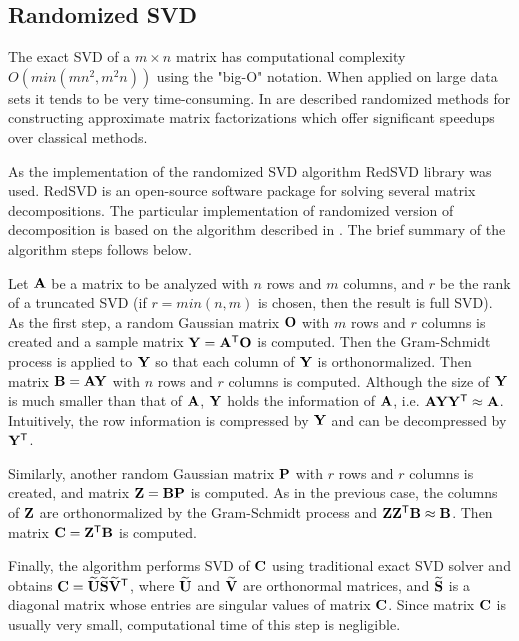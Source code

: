 \subsection{Randomized SVD}

The exact SVD of a $m \times n$ matrix has computational complexity \newline $O(min(mn^2, m^2n))$ using the "big-O" notation. When applied on large data sets it tends to be very time-consuming. In \cite{Holmes2007, Candes2011, Woolfe2008, Martinsson2011} are described randomized methods for constructing approximate matrix factorizations which offer significant speedups over classical methods.

As the implementation of the randomized SVD algorithm RedSVD library was used. RedSVD is an open-source software package for solving several matrix decompositions. The particular implementation of randomized version of decomposition is based on the algorithm described in \cite{Halko2011}. The brief summary of the algorithm steps follows below.

Let $\mathbf{A}$ be a matrix to be analyzed with $n$ rows and $m$ columns, and $r$ be the rank of a truncated SVD (if $r = min(n, m)$ is chosen, then the result is full SVD). As the first step, a random Gaussian matrix $\mathbf{O}$ with $m$ rows and $r$ columns is created and a sample matrix $\mathbf{Y} = \mathbf{A}^{\mathsf{T}} \mathbf{O}$ is computed. Then the Gram-Schmidt process is applied to $\mathbf{Y}$ so that each column of $\mathbf{Y}$ is orthonormalized. Then matrix $\mathbf{B} = \mathbf{A}\mathbf{Y}$ with $n$ rows and $r$ columns is computed. Although the size of $\mathbf{Y}$ is much smaller than that of $\mathbf{A}$, $\mathbf{Y}$ holds the information of $\mathbf{A}$, i.e. $\mathbf{A}\mathbf{Y}\mathbf{Y}^{\mathsf{T}} \approx \mathbf{A}$. Intuitively, the row information is compressed by $\mathbf{Y}$ and can be decompressed by $\mathbf{Y}^{\mathsf{T}}$.

Similarly, another random Gaussian matrix $\mathbf{P}$ with $r$ rows and $r$ columns is created, and matrix $\mathbf{Z} = \mathbf{B}\mathbf{P}$ is computed. As in the previous case, the columns of $\mathbf{Z}$ are orthonormalized by the Gram-Schmidt process and $\mathbf{Z}\mathbf{Z}^{\mathsf{T}} \mathbf{B} \approx \mathbf{B}$. Then matrix $\mathbf{C} = \mathbf{Z}^{\mathsf{T}} \mathbf{B}$ is computed.

Finally, the algorithm performs SVD of $\mathbf{C}$ using traditional exact SVD solver and obtains $\mathbf{C} = \mathbf{\widetilde{U}}\mathbf{\widetilde{S}}\mathbf{\widetilde{V}}^{\mathsf{T}}$, where $\mathbf{\widetilde{U}}$ and $\mathbf{\widetilde{V}}$ are orthonormal matrices, and $\mathbf{\widetilde{S}}$ is a diagonal matrix whose entries are singular values of matrix $\mathbf{C}$. Since matrix $\mathbf{C}$ is usually very small, computational time of this step is negligible.

